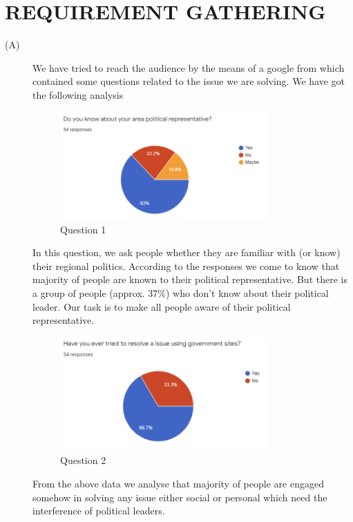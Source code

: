 \documentclass[acmtog]{acmart}
\begin{document}
\section{REQUIREMENT GATHERING}

\begin{description}
    \item[(A)] We have tried to reach the audience by the means of a google from which contained some questions related to the issue we are solving. We have got the following analysis

    \begin{figure}[H]
        \includegraphics[width=8cm]{Resources/q1}
        \caption{Question 1}
        \label{fig:q1}
    \end{figure}

    In this question, we ask people whether they are familiar with (or know) their regional politics. According to the responses we come to know that majority of people are known to their political representative. But there is a group of people (approx. 37\%) who don’t know about their political leader. Our task is to make all people aware of their political representative.

    \begin{figure}[H]
        \includegraphics[width=8cm]{Resources/q2}
        \caption{Question 2}
        \label{fig:q2}
    \end{figure}

    From the above data we analyse that majority of people are engaged somehow in solving any issue either social or personal which need the interference of political leaders.


\end{description}
\end{document}
